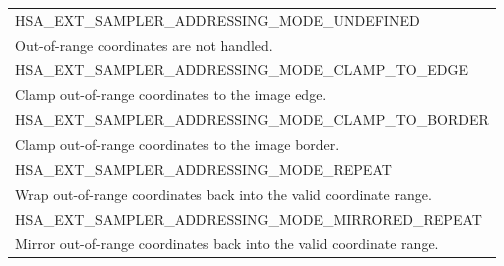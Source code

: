 \documentclass[final,oneside]{book}
\newcommand{\reftyp}[1]{#1}
\newcommand{\refenu}[1]{\reftyp{#1}}
\begin{document}
\begin{longtable}{@{\hspace{2em}}p{\linewidth-2em}}
\hspace{-2em}\refenu{HSA_\-EXT_\-SAMPLER_\-ADDRESSING_\-MODE_\-UNDEFINED}\\Out-of-range coordinates are not handled.\\[2mm]
\hspace{-2em}\refenu{HSA_\-EXT_\-SAMPLER_\-ADDRESSING_\-MODE_\-CLAMP_\-TO_\-EDGE}\\Clamp out-of-range coordinates to the image edge.\\[2mm]
\hspace{-2em}\refenu{HSA_\-EXT_\-SAMPLER_\-ADDRESSING_\-MODE_\-CLAMP_\-TO_\-BORDER}\\Clamp out-of-range coordinates to the image border.\\[2mm]
\hspace{-2em}\refenu{HSA_\-EXT_\-SAMPLER_\-ADDRESSING_\-MODE_\-REPEAT}\\Wrap out-of-range coordinates back into the valid coordinate range.\\[2mm]
\hspace{-2em}\refenu{HSA_\-EXT_\-SAMPLER_\-ADDRESSING_\-MODE_\-MIRRORED_\-REPEAT}\\Mirror out-of-range coordinates back into the valid coordinate range.
\end{longtable}
\end{document}
